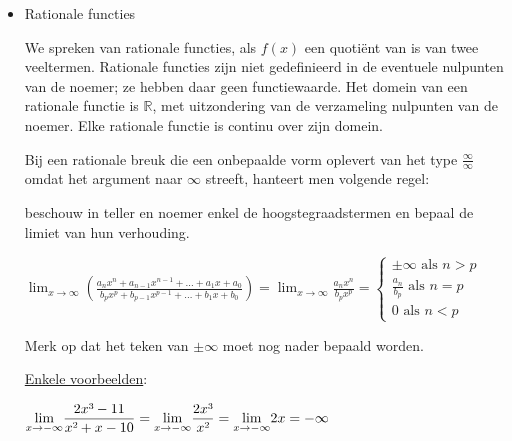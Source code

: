 \begin{itemize}
\item{Rationale functies}

\noindent We spreken van rationale functies, als $f(x)$ een quoti\"ent
van is van twee veeltermen. Rationale functies zijn niet gedefinieerd
in de eventuele nulpunten van de noemer; ze hebben daar geen functiewaarde.
Het domein van een rationale functie is $\mathbb{R}$, met uitzondering
van de verzameling nulpunten van de noemer. Elke rationale functie
is continu over zijn domein.

\noindent Bij een rationale breuk die een onbepaalde vorm oplevert
van het type $\frac{\infty}{\infty}$ omdat het argument naar $\infty$
streeft, hanteert men volgende regel: 

beschouw in teller en noemer enkel de hoogstegraadstermen en bepaal
de limiet van hun verhouding.

\medskip{}

\begin{math}
{\displaystyle \lim_{x\to\infty}}\left(\frac{a_{n}x^{n}+a_{n-1}x^{n-1}+\ldots+a_{1}x+a_{0}}{b_{p}x^{p}+b_{p-1}x^{p-1}+\ldots+b_{1}x+b_{0}}\right)={\displaystyle \lim_{x\to\infty}}{\displaystyle \frac{a_{n}x^{n}}{b_{p}x^{p}}} = 
\left\{
\begin{array}{l}
\pm\infty \text{ als } n>p \\
\frac{a_n}{b_p} \text{ als } n=p \\
0 \text{ als } n<p
\end{array}
\right.
\end{math}


Merk op dat het teken van $\pm\infty$ moet nog nader bepaald worden.

\medskip{}


\noindent \uline{Enkele voorbeelden}:

${\displaystyle \lim_{x\to-\infty}}{\displaystyle \frac{2x\text{\textthreesuperior}-11}{x\text{\texttwosuperior}+x-10}}={\displaystyle \lim_{x\to-\infty}}{\displaystyle \frac{2x\text{\textthreesuperior}}{x\text{\texttwosuperior}}}={\displaystyle \lim_{x\to-\infty}}2x=-\infty$


\end{itemize}
